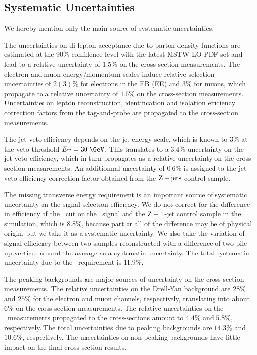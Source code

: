 \subsection{Systematic Uncertainties}

\def\GlobSystElec{ \ensuremath{ 18.9\%  }\xspace}
\def\GlobSystMuon{ \ensuremath{ 16.2\%  }\xspace}
\def\GlobSystComb{ \ensuremath{ 17.6\%  }\xspace}

We hereby mention only the main source of systematic uncertainties.

The uncertainties on di-lepton acceptance due to parton density functions are estimated at the 90\% confidence level with the latest MSTW-LO PDF set and lead to a relative uncertainty of $1.5\%$ on the cross-section measurements.  The electron and muon energy/momentum scales induce relative selection uncertainties of $2(3)\%$ for electrons in the EB (EE) and $3\%$ for muons, which propagate to a relative uncertainty of $1.5\%$ on the cross-section measurements.  Uncertainties on lepton reconstruction, identification and isolation efficiency correction factors from the tag-and-probe are propagated to the cross-section measurements. 

The jet veto efficiency depends on the jet energy scale, which is known to $3\%$ at the veto threshold $\ET=30~\GeV$. This translates to a $3.4\%$ uncertainty on the jet veto efficiency, which in turn propagates as a \JVUncEffect relative uncertainty on the cross-section measurements. An additionnal uncertainty of $0.6\%$ is assigned to the jet veto efficiency correction factor obtained from the $\mathrm{Z}+\mathrm{jets}$ control sample.

The missing transverse energy requirement is an important source of systematic uncertainty on the signal selection efficiency.  We do not correct for the difference in efficiency of the \CORRMET\ cut on the \ZZ\ signal and the $\mathrm{Z}+1$-jet control sample in the simulation, which is 8.8\%, because part or all of the difference may be of physical origin, but we take it as a systematic uncertainty.  We also take the variation of signal efficiency between two samples reconstructed with a difference of two pile-up vertices around the average as a systematic uncertainty. The total systematic uncertainty due to the \MET\ requirement is 11.9\%. 

The peaking backgrounds are major sources of uncertainty on the cross-section measurements.   The relative uncertainties on the Drell-Yan background are $28\%$ and $25\%$ for the electron and muon channels, respectively, translating into about $6\%$ on the cross-section measurements. The relative uncertainties on the \WZ\ measurements propagated to the cross-sections amount to $4.4\%$ and $5.8\%$, respectively. The total uncertainties due to peaking backgrounds are $14.3\%$ and $10.6\%$, respectively. The uncertainties on non-peaking backgrounds have little impact on the final cross-section results. 


